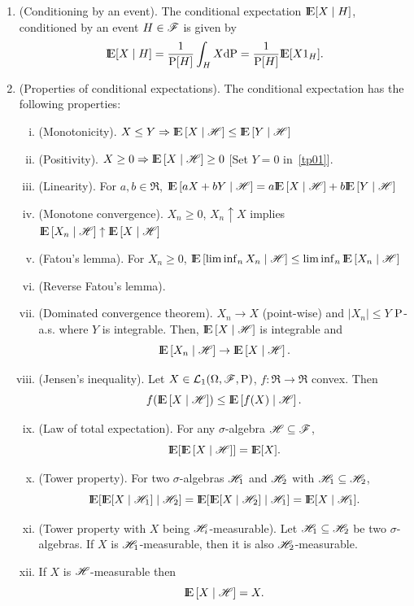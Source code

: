\documentclass[a4paper,10pt]{scrbook}
\newcommand{\ce}[1]{\E\left[#1 {}\mid{} \HH \right]}
\begin{document}
\begin{enumerate}
 \item (Conditioning by an event). The conditional expectation $\E[X\mid H]$, conditioned
       by an event $H\in\mathscr{F}$ is given by
       \[
        \E[X\mid H] = \frac{1}{\prob[H]}\int_H X\d\prob = \frac{1}{\prob[H]}\E[X1_H].
       \]

 \item (Properties of conditional expectations). 
       The conditional expectation has the following properties:
       \begin{enumerate}[i.]
	\item \label{tp01} (Monotonicity). $X\leq Y \Rightarrow \ce{X} \leq \ce{Y}$
	\item (Positivity).  $X\geq 0 \Rightarrow \ce{X} \geq 0$ [Set $Y=0$ in~\ref{tp01}]. 
	\item (Linearity). For $a,b\in\Re$, $\ce{aX+bY}=a\ce{X} + b \ce{Y}$
	\item (Monotone convergence). $X_n\geq 0$, $X_n \uparrow X$ implies $\ce{X_n}\uparrow \ce{X}$
	\item (Fatou's lemma). For $X_n\geq 0$, $\ce{\liminf_n X_n}\leq \liminf_n \ce{X_n}$
	\item (Reverse Fatou's lemma). 
	\item (Dominated convergence theorem). $X_n\to X$ (point-wise) and $|X_n|\leq Y$ $\mathrm{P}$-a.s. where $Y$ is
	      integrable. Then, $\ce{X}$ is integrable and 
	      \[
	       \ce{X_n} \to \ce{X}.
	      \]
        \item (Jensen's inequality). Let $X\in\mathcal{L}_1(\Omega,\mathscr{F},\mathrm{P})$, $f:\Re\to\Re$ convex. Then
	      \[
	      f(\ce{X})\leq \ce{f(X)}.
	      \]
        \item (Law of total expectation). For any $\sigma$-algebra $\mathscr{H} \subseteq \mathscr{F}$,
	      \[
	       \E[\ce{X}] = \E[X].
	      \]
        \item (Tower property). For two $\sigma$-algebras $\mathscr{H}_1$ and $\mathscr{H}_2$ with $\mathscr{H}_1\subseteq \mathscr{H}_2$,	      
	      \[
	       \E[\E[X {}\mid{} \HH_1] {}\mid{} \HH_2] = \E[\E[X {}\mid{} \HH_2] {}\mid{} \HH_1] = \E[X {}\mid{} \HH_1].
	      \]
        \item (Tower property with $X$ being $\mathscr{H}_i$-measurable). Let $\mathscr{H}_1\subseteq \mathscr{H}_2$ be two $\sigma$-algebras. 
	      If $X$ is $\mathscr{H}_1$-measurable, then it is also $\mathscr{H}_2$-measurable.
	    

        \item If $X$ is $\mathscr{H}$-measurable then
	      \[
	       \ce{X} = X.
	      \]

       \end{enumerate}
\end{enumerate}
\end{document}
